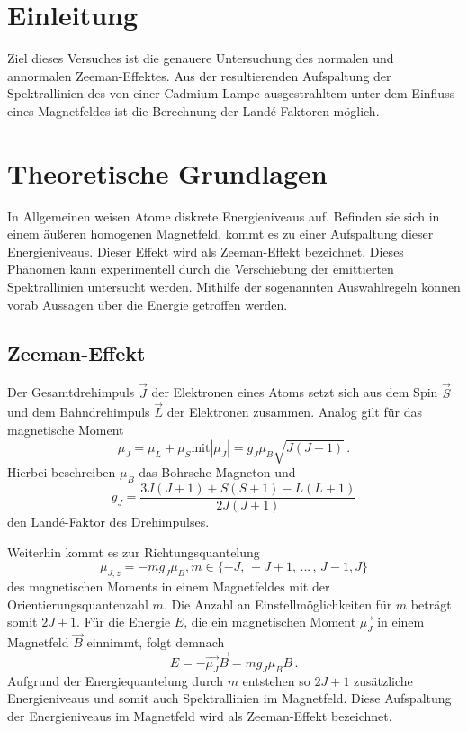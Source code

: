 \section{Einleitung}
Ziel dieses Versuches ist die genauere Untersuchung des normalen und annormalen Zeeman-Effektes.
Aus der resultierenden Aufspaltung der Spektrallinien des von einer Cadmium-Lampe ausgestrahltem
unter dem Einfluss eines Magnetfeldes ist die Berechnung der Landé-Faktoren möglich. \\

\section{Theoretische Grundlagen}
In Allgemeinen weisen Atome diskrete Energieniveaus auf. Befinden sie sich in einem äußeren homogenen
Magnetfeld, kommt es zu einer Aufspaltung dieser Energieniveaus. Dieser Effekt wird als Zeeman-Effekt
bezeichnet. Dieses Phänomen kann experimentell durch die Verschiebung der emittierten Spektrallinien
untersucht werden. Mithilfe der sogenannten Auswahlregeln können vorab Aussagen über die
Energie getroffen werden.

\subsection{Zeeman-Effekt}
Der Gesamtdrehimpuls $\vec{J}$ der Elektronen eines Atoms setzt sich aus dem Spin $\vec{S}$ und dem Bahndrehimpuls $\vec{L}$ der Elektronen zusammen.
Analog gilt für das magnetische Moment
\begin{equation*}
  \mu_J = \mu_L + \mu_S \text{mit} |\mu_J| = g_J \mu_B \sqrt{J (J + 1)} \, .
\end{equation*}
Hierbei beschreiben $\mu_B$ das Bohrsche Magneton und
\begin{equation}\label{eqn:Lande}
  g_J = \frac{3J(J + 1) + S(S + 1) − L(L + 1)}{2J (J + 1)}
\end{equation}
den Landé-Faktor des Drehimpulses.

Weiterhin kommt es zur Richtungsquantelung
\begin{equation*}
  \mu_{J,z} = −m g_J \mu_B, m \in \{ -J,\, -J+1, \, ... \, ,\, J-1, J \}
\end{equation*}
des magnetischen Moments in einem Magnetfeldes mit der Orientierungsquantenzahl $m$.
Die Anzahl an Einstellmöglichkeiten für $m$ beträgt somit $2J+1$.
Für die Energie $E$, die ein magnetischen Moment $\vec{\mu_J}$ in einem Magnetfeld $\vec{B}$ einnimmt, folgt demnach
\begin{equation*}
  E = -\vec{\mu_J} \vec{B} = m g_J \mu_B B \, .
\end{equation*}
Aufgrund der Energiequantelung durch $m$ entstehen so $2J+1$ zusätzliche Energieniveaus und somit auch Spektrallinien im Magnetfeld.
Diese Aufspaltung der Energieniveaus im Magnetfeld wird als Zeeman-Effekt bezeichnet.

